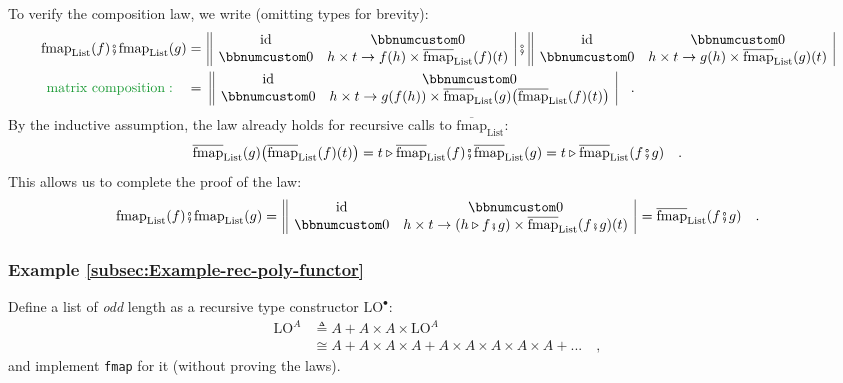 To verify the composition law, we write (omitting types for brevity):
\begin{align*}
\text{fmap}_{\text{List}}(f)\bef\text{fmap}_{\text{List}}(g) & =\,\begin{array}{||cc|}
\text{id} & \bbnum 0\\
\bbnum 0 & h\times t\rightarrow f(h)\times\overline{\text{fmap}}_{\text{List}}(f)(t)
\end{array}\,\bef\,\begin{array}{||cc|}
\text{id} & \bbnum 0\\
\bbnum 0 & h\times t\rightarrow g(h)\times\overline{\text{fmap}}_{\text{List}}(g)(t)
\end{array}\\
{\color{greenunder}\text{matrix composition}:}\quad & =\,\,\begin{array}{||cc|}
\text{id} & \bbnum 0\\
\bbnum 0 & h\times t\rightarrow g(f(h))\times\overline{\text{fmap}}_{\text{List}}(g)\big(\overline{\text{fmap}}_{\text{List}}(f)(t)\big)
\end{array}\quad.
\end{align*}
By the inductive assumption, the law already holds for recursive calls
to $\overline{\text{fmap}}_{\text{List}}$:
\[
\overline{\text{fmap}}_{\text{List}}(g)\big(\overline{\text{fmap}}_{\text{List}}(f)(t)\big)=t\triangleright\overline{\text{fmap}}_{\text{List}}(f)\bef\overline{\text{fmap}}_{\text{List}}(g)=t\triangleright\overline{\text{fmap}}_{\text{List}}(f\bef g)\quad.
\]
This allows us to complete the proof of the law:
\[
\text{fmap}_{\text{List}}(f)\bef\text{fmap}_{\text{List}}(g)=\,\begin{array}{||cc|}
\text{id} & \bbnum 0\\
\bbnum 0 & h\times t\rightarrow(h\triangleright f\bef g)\times\overline{\text{fmap}}_{\text{List}}(f\bef g)(t)
\end{array}\,=\overline{\text{fmap}}_{\text{List}}(f\bef g)\quad.
\]


\subsubsection{Example \label{subsec:Example-rec-poly-functor}\ref{subsec:Example-rec-poly-functor}}

Define a list of \emph{odd} length as a recursive type constructor
$\text{LO}^{\bullet}$:
\begin{align}
\text{LO}^{A} & \triangleq A+A\times A\times\text{LO}^{A}\label{eq:f-lo-def}\\
 & \cong A+A\times A\times A+A\times A\times A\times A\times A+...\quad,\nonumber 
\end{align}
and implement \lstinline!fmap! for it (without proving the laws).

